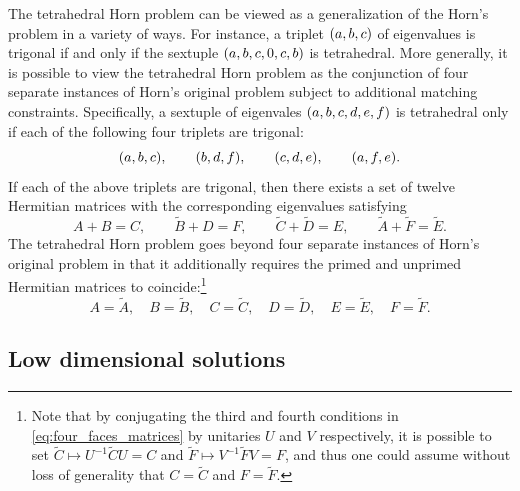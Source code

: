\documentclass[notitlepage, 10pt]{article}
\begin{document}
The tetrahedral Horn problem can be viewed as a generalization of the Horn's problem in a variety of ways.
For instance, a triplet $(a,b,c)$ of eigenvalues is trigonal if and only if the sextuple $(a,b,c,0,c,b)$ is tetrahedral.
More generally, it is possible to view the tetrahedral Horn problem as the conjunction of four separate instances of Horn's original problem subject to additional matching constraints.
Specifically, a sextuple of eigenvales $(a,b,c,d,e,f)$ is tetrahedral only if each of the following four triplets are trigonal:
\begin{equation}
    \label{eq:four_faces}
    (a,b,c), \qquad
    (b,d,f), \qquad
    (c,d,e), \qquad
    (a,f,e).
\end{equation}
If each of the above triplets are trigonal, then there exists a set of twelve Hermitian matrices with the corresponding eigenvalues satisfying
\begin{equation}
    \label{eq:four_faces_matrices}
    A+B=C, \qquad \tilde B+D=F, \qquad \tilde C+\tilde D=E, \qquad \tilde A+\tilde F=\tilde E.
\end{equation}
The tetrahedral Horn problem goes beyond four separate instances of Horn's original problem in that it additionally requires the primed and unprimed Hermitian matrices to coincide:\footnote{Note that by conjugating the third and fourth conditions in \cref{eq:four_faces_matrices} by unitaries $U$ and $V$ respectively, it is possible to set $\tilde C \mapsto U^{-1} \tilde C U = C$ and $\tilde F \mapsto V^{-1} \tilde F V = F$, and thus one could assume without loss of generality that $C=\tilde C$ and $F=\tilde F$.}
\begin{equation}
    A = \tilde A, \quad
    B = \tilde B, \quad
    C = \tilde C, \quad
    D = \tilde D, \quad
    E = \tilde E, \quad
    F = \tilde F.
\end{equation}

\subsection{Low dimensional solutions}
\end{document}
